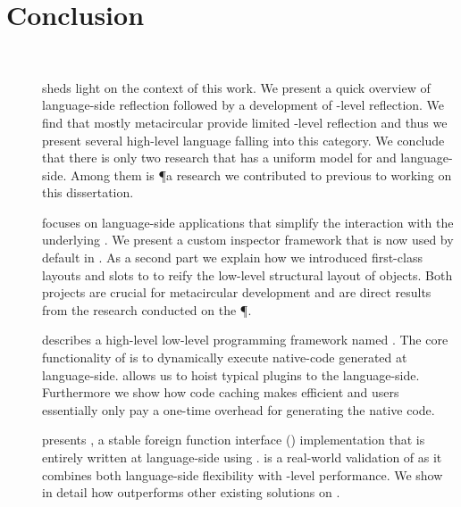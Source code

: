 
\chapter{Conclusion}
\minitoc
\introduction 

\\

\begin{description}
\item[] sheds light on the context of this work.
	We present a quick overview of language-side reflection followed by a development of \VM-level reflection.
	We find that mostly metacircular \VMs provide limited \VM-level reflection and thus we present several high-level language \VMs falling into this category.
	We conclude that there is only two research \VM that has a uniform model for \VM and language-side.
	Among them is \P a research \ST \VM we contributed to previous to working on this dissertation.

\item[] focuses on language-side applications that simplify the interaction with the underlying \VM.
	We present a custom inspector framework that is now used by default in \PH.
	As a second part we explain how we introduced first-class layouts and slots to \PH to reify the low-level structural layout of objects.
	Both projects are crucial for metacircular \VM development and are direct results from the research conducted on the \P \VM.

\item[] describes a high-level low-level programming framework named \B.
	The core functionality of \B is to dynamically execute native-code generated at language-side.
	\B allows us to hoist typical \VM plugins to the language-side.
	Furthermore we show how code caching makes \B efficient and users essentially only pay a one-time overhead for generating the native code.
	
\item[] presents \NB, a stable foreign function interface (\FFI) implementation that is entirely written at language-side using \B.
	\NB is a real-world validation of \B as it combines both language-side flexibility with \VM-level performance.
	We show in detail how \NB outperforms other existing \FFI solutions on \PH.


\end{description}
